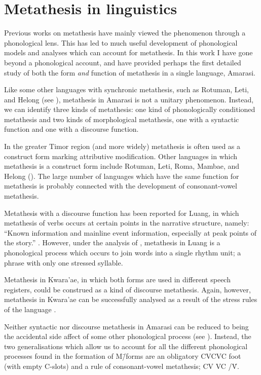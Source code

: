 \section{Metathesis in linguistics}\label{sec:MetLin}
Previous works on metathesis have mainly viewed the phenomenon through a phonological lens.
This has led to much useful development of phonological
models and analyses which can account for metathesis.
In this work I have gone beyond a phonological account,
and have provided perhaps the first detailed study of both the form
\emph{and} function of metathesis in a single language, Amarasi.

Like some other languages with synchronic metathesis,
such as Rotuman, Leti, and Helong (see ),
metathesis in Amarasi is not a unitary phenomenon.
Instead, we can identify three kinds of metathesis:
one kind of phonologically conditioned metathesis and two
kinds of morphological metathesis, one with a syntactic
function and one with a discourse function.

In the greater Timor region (and more widely) metathesis is
often used as a construct form marking attributive modification.
Other languages in which metathesis is a construct form
include Rotuman, Leti, Roma, Mambae, and Helong  ().
The large number of languages which have the same function for metathesis
is probably connected with the development of consonant-vowel metathesis.

Metathesis with a discourse function has been
reported for Luang, in which metathesis of verbs
occurs at certain points in the narrative structure, namely:
``Known information and mainline event information,
especially at peak points of the story.'' \citep[24]{tata15}.
However, under the analysis of \cite{tata15}, metathesis
in Luang is a phonological process which occurs
to join words into a single rhythm unit;
a phrase with only one stressed syllable.

Metathesis in Kwara'ae, in which both forms
are used in different speech registers,
could be construed as a kind of discourse metathesis.
Again, however, metathesis in Kwara'ae can be successfully analysed
as a result of the stress rules of the language \citep{he04}.

\largerpage
Neither syntactic nor discourse metathesis
in Amarasi can be reduced to being the accidental side affect of some other
phonological process (see ).
Instead, the two generalisations which allow
us to account for all the different phonological processes
found in the formation of M\=/forms
are an obligatory CVCVC foot (with empty C-slots)
and a rule of consonant-vowel metathesis; CV {\ra} VC /\'V{\gap}.

